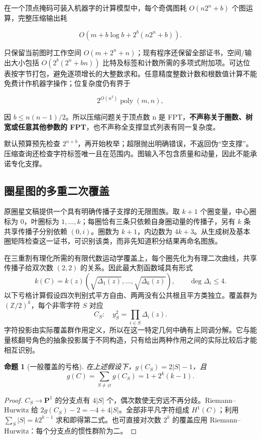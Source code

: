 \documentclass[11pt,a4paper,oneside]{ctexart}
\theoremstyle{cnplain}
\newtheorem{proposition}[theorem]{命题}
\theoremstyle{definition}
\theoremstyle{remark}
\newcommand{\Z}{\mathbb Z}
\numberwithin{equation}{section}
\begin{document}
在一个顶点掩码可装入机器字的计算模型中，每个奇偶图耗 \(O(n2^n+b)\) 个图运算，完整压缩输出耗

\begin{equation}
O(m+b\log b+2^b(n2^n+b)).
\end{equation}

只保留当前图时工作空间 \(O(m+2^n+n)\)；现有程序还保留全部证书，空间/输出大小包括 \(O(2^b(2^n+bn))\) 比特及标签和计数所需的多项式附加项。可达位表按字节打包，避免逐项增长的大整数求和。任意精度整数计数和根数值计算不能免费计作机器字操作；位复杂度仍有界于

\begin{equation}
2^{O(n^2)}\operatorname{poly}(m,n),
\end{equation}

因 \(b\le n(n-1)/2\)。所以压缩问题关于顶点数 n 是 FPT，\textbf{不声称关于圈数、树宽或任意其他参数的 FPT}，也不声称全支撑显式列表有同一复杂度。

默认预算预先检查 \(2^{n+b}\)，再开始枚举；超限抛出明确错误，不返回伪``空支撑''。压缩查询还检查字符标签唯一且在范围内。图输入不包含质量和动量，因此不能承诺专化支撑。



\subsection{圈星图的多重二次覆盖}
原圈星文稿提供一个具有明确传播子支撑的无限图族。取 $k+1$ 个圈变量，中心圈标为 $0$，叶圈标为 $1,\ldots,k$；每圈恰有三条只依赖自身圈动量的传播子，另有 $k$ 条共享传播子分别依赖 $(0,i)$。圈数为 $k+1$，内边数为 $4k+3$。从生成树及基本圈矩阵检查这一证书，可识别该类，而非先知道积分结果再命名图族。

在三重割有理化所需的有限代数运动学覆盖上，每个圈先化为有理二次曲线，共享传播子给双次数 $(2,2)$ 的关系。因此最大割函数域具有形式
\begin{equation}
 k(C)=k(z)(\sqrt{\Delta_1(z)},\ldots,\sqrt{\Delta_k(z)}),
 \qquad\deg\Delta_i\le4.
\end{equation}
以下亏格计算假设四次判别式平方自由、两两没有公共根且平方类独立。覆盖群为 $(\Z/2)^k$，每个非零字符 $S$ 对应
\begin{equation}
 C_S:\quad y_S^2=\prod_{i\in S}\Delta_i(z).
\end{equation}
字符投影由实际覆盖群作用定义，所以在这一特定几何中确有上同调分解。它与能量核翻号角色的抽象投影属于不同构造，只有给出两种作用之间的实际比较后才能相互识别。

\begin{proposition}[一般覆盖的亏格]
在上述假设下，$g(C_S)=2|S|-1$，且
\begin{equation}
 g(C)=\sum_{S\ne\varnothing}g(C_S)=1+2^k(k-1).
\end{equation}
\end{proposition}
\begin{proof}
$C_S\to\mathbf P^1$ 的分支点有 $4|S|$ 个，偶次数使无穷远不再分歧。Riemann--Hurwitz 给 $2g(C_S)-2=-4+4|S|$。全部非平凡字符组成 $H^1(C)$；利用 $\sum_S|S|=k2^{k-1}$ 求和即得第二式。也可直接对次数 $2^k$ 的覆盖应用 Riemann--Hurwitz：每个分支点的惯性群阶为二。
\end{proof}
\end{document}

